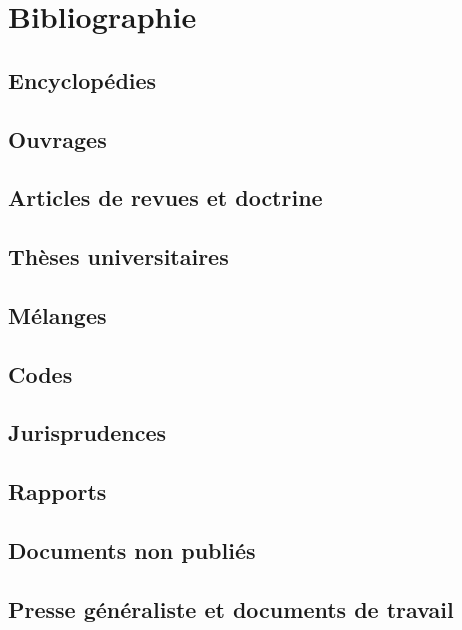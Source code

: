 \chapter*{Bibliographie}

\section*{Encyclopédies}
\section*{Ouvrages}
\section*{Articles de revues et doctrine}
\section*{Thèses universitaires}
\section*{Mélanges}
\section*{Codes}
\section*{Jurisprudences}
\section*{Rapports}
\section*{Documents non publiés}
\section*{Presse généraliste et documents de travail}

\newpage